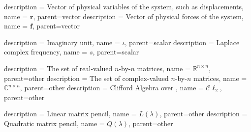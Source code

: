 {
	description = {Vector of physical variables of the system, such as displacements}, 
	name = {\ensuremath{\mathbf{r}}},
	parent=vector
}
{
	description = {Vector of physical forces of the system}, 
	name = {\ensuremath{\mathbf{f}}},
	parent=vector
}


{
	description = {Imaginary unit}, 
	name = {\ensuremath{\iota}},
	parent=scalar
}
{
	description = {Laplace complex frequency}, 
	name = {\ensuremath{s}},
	parent=scalar
}


{
	description = {The set of real-valued \ensuremath{n}-by-\ensuremath{n} matrices}, 
	name = {\ensuremath{\mathbb{R}^{n\times n}}},
	parent=other
}
{
	description = {The set of complex-valued \ensuremath{n}-by-\ensuremath{n} matrices}, 
	name = {\ensuremath{\mathbb{C}^{n\times n}}},
	parent=other
}
{
	description = {Clifford Algebra over }, 
	name = {\ensuremath{\mathcal{C}\ell_2}},
	parent=other
}


{
	description = {Linear matrix pencil}, 
	name = {\ensuremath{L(\lambda)}},
	parent=other
}
{
	description = {Quadratic matrix pencil}, 
	name = {\ensuremath{Q(\lambda)}},
	parent=other
}


